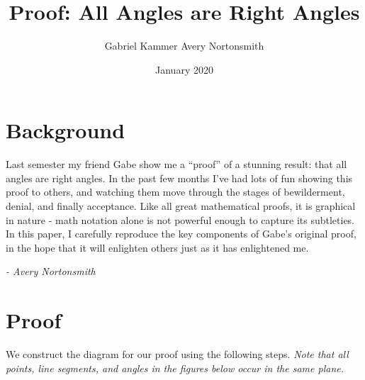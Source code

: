 \documentclass[11pt]{article}
\title{Proof: All Angles are Right Angles}
\author{Gabriel Kammer \hspace{.2cm} Avery Nortonsmith}
\date{January 2020}
\begin{document}
\maketitle

\vspace{1cm}

\begin{center}
\end{center}

\vspace{1cm}

\section{Background}

Last semester my friend Gabe show me a ``proof'' of a stunning result: that all angles are right angles. In the past few months I've had lots of fun showing this proof to others, and watching them move through the stages of bewilderment, denial, and finally acceptance. Like all great mathematical proofs, it is graphical in nature - math notation alone is not powerful enough to capture its subtleties. In this paper, I carefully reproduce the key components of Gabe's original proof, in the hope that it will enlighten others just as it has enlightened me.

\vspace{.2cm}

\hfill \emph{- Avery Nortonsmith}

\newpage

\section{Proof}

We construct the diagram for our proof using the following steps. \emph{Note that all points, line segments, and angles in the figures below occur in the same plane. }
\end{document}

